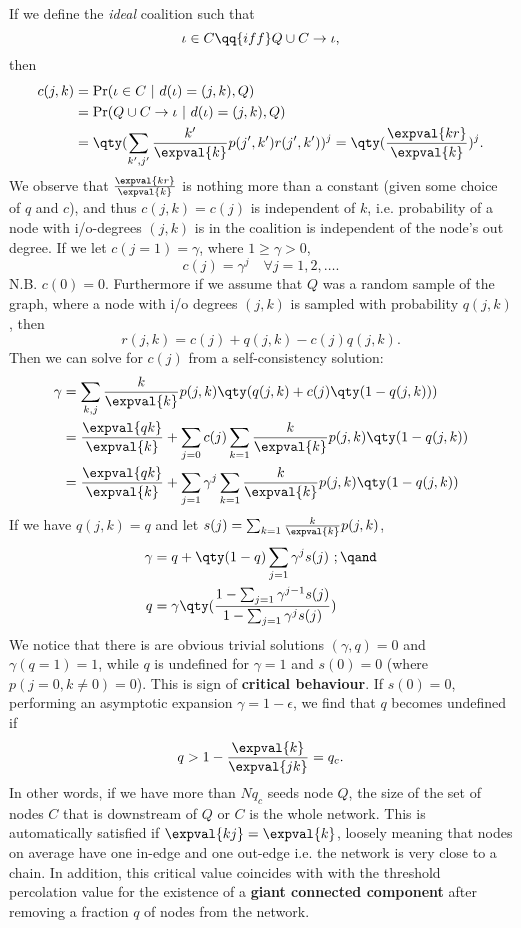 If we define the \emph{ideal} coalition such that
\begin{equation}
\iota \in C \qq{iff} Q \cup C \to \iota,
\end{equation}
then
\begin{align}
c(j,k) &= \Pr(\iota \in C \ \lvert \ d(\iota) = (j,k), Q)\\
 &=  \Pr(Q \cup C \to \iota \ \lvert \ d(\iota) = (j,k), Q) \\
 &= \qty(\sum_{k',j'}\frac{k'}{\expval{k}} p(j', k')r(j', k'))^j = \qty(\frac{\expval{kr}}{\expval{k}})^j.
\end{align}
We observe that $\frac{\expval{kr}}{\expval{k}}$ is nothing more than a constant (given some choice of $q$ and $c$), and thus $c(j,k) = c(j)$ is independent of $k$, i.e. probability of a node with i/o-degrees $(j,k)$ is in the coalition is independent of the node's out degree. If we let $c(j=1) = \gamma$, where $1 \geq \gamma > 0$,
\begin{equation}
c(j) = \gamma^j \quad \forall j = 1,2, \ldots.
\end{equation}
N.B. $c(0) = 0$. Furthermore if we assume that $Q$ was a random sample of the graph, where a node with i/o degrees $(j,k)$ is sampled with probability $q(j,k)$, then
\begin{equation}
r(j,k) = c(j) + q(j,k) - c(j)q(j,k).
\end{equation}
Then we can solve for $c(j)$ from a self-consistency solution:
\begin{align}
\gamma &= \sum_{k,j}\frac{k}{\expval{k}} p(j, k)\qty(q(j,k) + c(j)\qty(1-q(j,k)))\\
&= \frac{\expval{qk}}{\expval{k}} + \sum_{j=0}c(j)\sum_{k=1}\frac{k}{\expval{k}} p(j, k)\qty(1-q(j,k)) \\
&= \frac{\expval{qk}}{\expval{k}} + \sum_{j=1}\gamma^j\sum_{k=1}\frac{k}{\expval{k}} p(j, k)\qty(1-q(j,k))
\end{align}
If we have $q(j,k) = q$ and let $s(j) = \sum_{k=1}\frac{k}{\expval{k}} p(j, k)$,
\begin{align}
\gamma &= q + \qty(1-q) \sum_{j=1}\gamma^{j}s(j)\ ; \qand \\
q &= \gamma \qty(\frac{1-\sum_{j=1} \gamma^{j-1}s(j)}{1-\sum_{j=1} \gamma^js(j)})
\end{align}
We notice that there is are obvious trivial solutions $(\gamma, q) = 0$ and $\gamma(q=1) = 1$, while $q$ is undefined for $\gamma = 1$ and $s(0) = 0$ (where $p(j=0, k \neq 0)=0$). This is sign of \textbf{critical behaviour}. If $s(0) = 0$, performing an asymptotic expansion $\gamma = 1-\epsilon$, we find that $q$ becomes undefined if
\begin{equation}
q > 1 - \frac{\expval{k}}{\expval{jk}} = q_c.
\end{equation}
In other words, if we have more than $Nq_c$ seeds node $Q$, the size of the set of nodes $C$ that is downstream of $Q$ or $C$ is the whole network. This is automatically satisfied if $\expval{kj} = \expval{k}$, loosely meaning that nodes on average have one in-edge and one out-edge i.e. the network is very close to a chain. In addition, this critical value coincides with with the threshold percolation value for the existence of a \textbf{giant connected component} after removing a fraction $q$ of nodes from the network.
